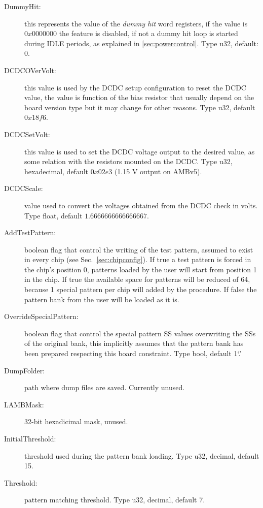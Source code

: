 \begin{description}
\item[DummyHit:] this represents the value of the \emph{dummy hit} word registers,
if the value is $0x0000000$ the feature is disabled, if not a dummy hit loop is
started during IDLE periods, as explained in \ref{sec:powercontrol}. Type u32,
default: 0.

\item[DCDCOVerVolt:] this value is used by the DCDC setup configuration to reset
the DCDC value, the value is function of the bias resistor that usually depend
on the board version type but it may change for other reasons. Type u32, default
$0x18f6$.

\item[DCDCSetVolt:] this value is used to set the DCDC voltage output to the
desired value, as some relation with the resistors mounted on the DCDC. Type u32,
hexadecimal, default $0x02e3$ (1.15 V output on AMBv5).

\item[DCDCScale:] value used to convert the voltages obtained from the DCDC
check in volts. Type float, default $1.6666666666666667$.

\item[AddTestPattern:] boolean flag that control the writing of the test pattern,
assumed to exist in every chip (see Sec.~\ref{sec:chipconfig}). If true a test
pattern is forced in the chip's position 0, patterns loaded by the user will start from
position 1 in the chip. If true the available space for patterns will be
reduced of 64, because 1 special pattern per chip will added by the procedure.
If false the pattern bank from the user will be loaded as it is.

\item[OverrideSpecialPattern:] boolean flag that control the special pattern
SS values overwriting the SSs of the original bank, this implicitly assumes 
that the pattern bank has been prepared respecting this board constraint.
Type bool, default 1`.'

\item[DumpFolder:] path where dump files are saved. Currently unused.

\item[LAMBMask:] 32-bit hexadicimal mask, unused.

\item[InitialThreshold:] threshold used during the pattern bank loading. Type u32,
decimal, default 15.

\item[Threshold:] pattern matching threshold. Type u32, decimal, default 7.


\end{description}
